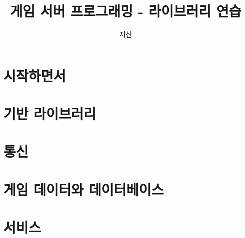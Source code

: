 \documentclass{book}
\begin{document}
\title{게임 서버 프로그래밍 - 라이브러리 연습}
\author{지산}
\maketitle
\tableofcontents

\part{시작하면서}



\part{기반 라이브러리}


\part{통신}


\part{게임 데이터와 데이터베이스}


\part{서비스}

\end{document}
